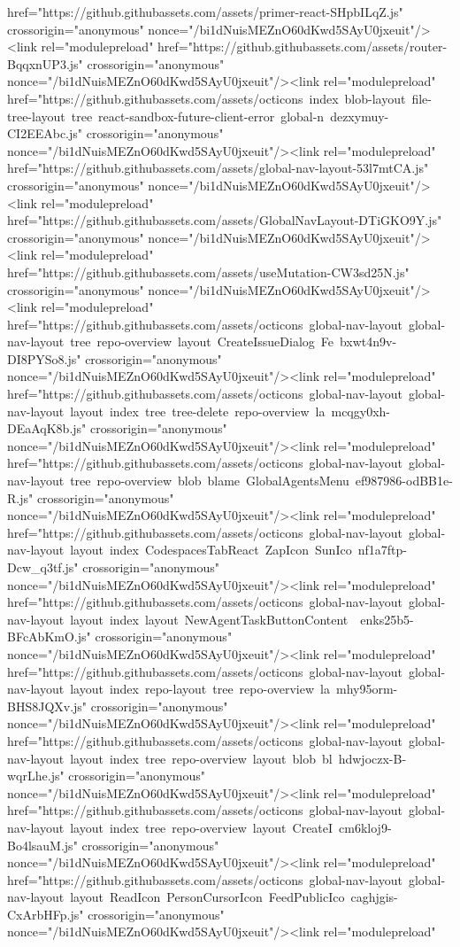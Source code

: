 href="https://github.githubassets.com/assets/primer-react-SHpbILqZ.js" crossorigin="anonymous" nonce="/bi1dNuisMEZnO60dKwd5SAyU0jxeuit"/><link rel="modulepreload" href="https://github.githubassets.com/assets/router-BqqxnUP3.js" crossorigin="anonymous" nonce="/bi1dNuisMEZnO60dKwd5SAyU0jxeuit"/><link rel="modulepreload" href="https://github.githubassets.com/assets/octicons~index~blob-layout~file-tree-layout~tree~react-sandbox-future-client-error~global-n~dezxymuy-CI2EEAbc.js" crossorigin="anonymous" nonce="/bi1dNuisMEZnO60dKwd5SAyU0jxeuit"/><link rel="modulepreload" href="https://github.githubassets.com/assets/global-nav-layout-53l7mtCA.js" crossorigin="anonymous" nonce="/bi1dNuisMEZnO60dKwd5SAyU0jxeuit"/><link rel="modulepreload" href="https://github.githubassets.com/assets/GlobalNavLayout-DTiGKO9Y.js" crossorigin="anonymous" nonce="/bi1dNuisMEZnO60dKwd5SAyU0jxeuit"/><link rel="modulepreload" href="https://github.githubassets.com/assets/useMutation-CW3sd25N.js" crossorigin="anonymous" nonce="/bi1dNuisMEZnO60dKwd5SAyU0jxeuit"/><link rel="modulepreload" href="https://github.githubassets.com/assets/octicons~global-nav-layout~global-nav-layout~tree~repo-overview~layout~CreateIssueDialog~Fe~bxwt4n9v-DI8PYSo8.js" crossorigin="anonymous" nonce="/bi1dNuisMEZnO60dKwd5SAyU0jxeuit"/><link rel="modulepreload" href="https://github.githubassets.com/assets/octicons~global-nav-layout~global-nav-layout~layout~index~tree~tree-delete~repo-overview~la~mcqgy0xh-DEaAqK8b.js" crossorigin="anonymous" nonce="/bi1dNuisMEZnO60dKwd5SAyU0jxeuit"/><link rel="modulepreload" href="https://github.githubassets.com/assets/octicons~global-nav-layout~global-nav-layout~tree~repo-overview~blob~blame~GlobalAgentsMenu~ef987986-odBB1e-R.js" crossorigin="anonymous" nonce="/bi1dNuisMEZnO60dKwd5SAyU0jxeuit"/><link rel="modulepreload" href="https://github.githubassets.com/assets/octicons~global-nav-layout~global-nav-layout~layout~index~CodespacesTabReact~ZapIcon~SunIco~nf1a7ftp-Dcw_q3tf.js" crossorigin="anonymous" nonce="/bi1dNuisMEZnO60dKwd5SAyU0jxeuit"/><link rel="modulepreload" href="https://github.githubassets.com/assets/octicons~global-nav-layout~global-nav-layout~layout~index~layout~NewAgentTaskButtonContent~~enks25b5-BFcAbKmO.js" crossorigin="anonymous" nonce="/bi1dNuisMEZnO60dKwd5SAyU0jxeuit"/><link rel="modulepreload" href="https://github.githubassets.com/assets/octicons~global-nav-layout~global-nav-layout~layout~index~repo-layout~tree~repo-overview~la~mhy95orm-BHS8JQXv.js" crossorigin="anonymous" nonce="/bi1dNuisMEZnO60dKwd5SAyU0jxeuit"/><link rel="modulepreload" href="https://github.githubassets.com/assets/octicons~global-nav-layout~global-nav-layout~layout~index~tree~repo-overview~layout~blob~bl~hdwjoczx-B-wqrLhe.js" crossorigin="anonymous" nonce="/bi1dNuisMEZnO60dKwd5SAyU0jxeuit"/><link rel="modulepreload" href="https://github.githubassets.com/assets/octicons~global-nav-layout~global-nav-layout~layout~index~tree~repo-overview~layout~CreateI~cm6kloj9-Bo4lsauM.js" crossorigin="anonymous" nonce="/bi1dNuisMEZnO60dKwd5SAyU0jxeuit"/><link rel="modulepreload" href="https://github.githubassets.com/assets/octicons~global-nav-layout~global-nav-layout~layout~ReadIcon~PersonCursorIcon~FeedPublicIco~caghjgis-CxArbHFp.js" crossorigin="anonymous" nonce="/bi1dNuisMEZnO60dKwd5SAyU0jxeuit"/><link rel="modulepreload" 